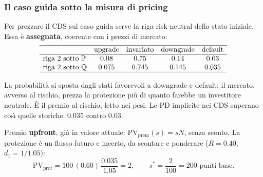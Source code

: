 \begin{frame}%
%

\frametitle{Il caso guida sotto la misura di pricing}%
%

%


Per prezzare il CDS sul caso guida serve la riga risk-neutral dello stato
iniziale. Essa \`{e} \textbf{assegnata}, coerente con i prezzi di mercato:
\[%
\begin{array}
[c]{lcccc}\hline
& \text{upgrade} & \text{invariato} & \text{downgrade} & \text{default}%
\\\hline
\text{riga 2 sotto }\Prob & 0.08 & 0.75 & 0.14 & 0.03\\
\text{riga 2 sotto }\Q & 0.075 & 0.745 & 0.145 & 0.035\\\hline
\end{array}
\]


\begin{stepitemize}
\item La probabilit\`{a} si sposta dagli stati favorevoli a downgrade e
default: il mercato, avverso al rischio, prezza la protezione pi\`{u} di
quanto farebbe un investitore neutrale. \`{E} il premio al rischio, letto nei
pesi. Le $\mathrm{PD}$ implicite nei CDS superano cos\`{\i} quelle storiche:
$0.035$ contro $0.03$.

\item Premio \textbf{upfront}, gi\`{a} in valore attuale: $\mathrm{PV}%
_{\mathrm{prem}}(s)=sN$, senza sconto. La protezione \`{e} un flusso futuro e
incerto, da scontare e ponderare ($R=0.40$, $d_{1}=1/1.05$):
\[
\mathrm{PV}_{\mathrm{prot}} = 100\,(0.60)\,\frac{0.035}{1.05} = 2, \qquad
s^{*} = \frac{2}{100} = 200 \text{ punti base}.
\]

\end{stepitemize}

%

\transboxout
\end{frame}%




